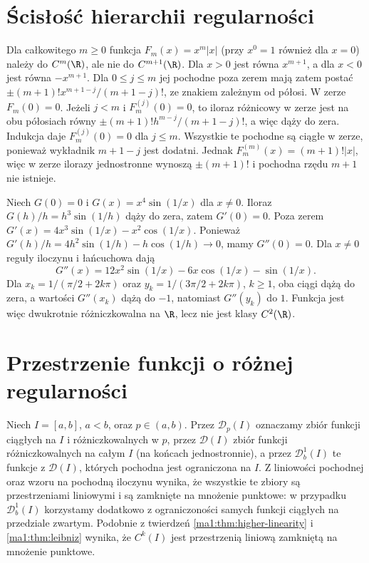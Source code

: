 \section{Ścisłość hierarchii regularności}
\begin{przyklad}
\label{ma1:ex:strict-c-hierarchy}
Dla całkowitego $m\ge0$ funkcja $F_m(x)=x^m|x|$ (przy $x^0=1$ również dla $x=0$) należy do $C^m(\R)$, ale nie do $C^{m+1}(\R)$. Dla $x>0$ jest równa $x^{m+1}$, a dla $x<0$ jest równa $-x^{m+1}$. Dla $0\le j\le m$ jej pochodne poza zerem mają zatem postać $\pm (m+1)!x^{m+1-j}/(m+1-j)!$, ze znakiem zależnym od półosi. W zerze $F_m(0)=0$. Jeżeli $j<m$ i $F_m^{(j)}(0)=0$, to iloraz różnicowy w zerze jest na obu półosiach równy $\pm (m+1)!h^{m-j}/(m+1-j)!$, a więc dąży do zera. Indukcja daje $F_m^{(j)}(0)=0$ dla $j\le m$. Wszystkie te pochodne są ciągłe w zerze, ponieważ wykładnik $m+1-j$ jest dodatni. Jednak $F_m^{(m)}(x)=(m+1)!|x|$, więc w zerze ilorazy jednostronne wynoszą $\pm(m+1)!$ i pochodna rzędu $m+1$ nie istnieje.
\end{przyklad}

\begin{przyklad}
\label{ma1:ex:second-derivative-discontinuous}
Niech $G(0)=0$ i $G(x)=x^4\sin(1/x)$ dla $x\ne0$. Iloraz $G(h)/h=h^3\sin(1/h)$ dąży do zera, zatem $G'(0)=0$. Poza zerem
$G'(x)=4x^3\sin(1/x)-x^2\cos(1/x)$.
Ponieważ $G'(h)/h=4h^2\sin(1/h)-h\cos(1/h)\to0$, mamy $G''(0)=0$. Dla $x\ne0$ reguły iloczynu i łańcuchowa dają
\[
 G''(x)=12x^2\sin(1/x)-6x\cos(1/x)-\sin(1/x).
\]
Dla $x_k=1/(\pi/2+2k\pi)$ oraz $y_k=1/(3\pi/2+2k\pi)$, $k\ge1$, oba ciągi dążą do zera, a wartości $G''(x_k)$ dążą do $-1$, natomiast $G''(y_k)$ do $1$. Funkcja jest więc dwukrotnie różniczkowalna na $\R$, lecz nie jest klasy $C^2(\R)$.
\end{przyklad}

\section{Przestrzenie funkcji o różnej regularności}
\label{ma1:sec:differentiable-function-classes}

Niech $I=[a,b]$, $a<b$, oraz $p\in(a,b)$.
Przez $\mathcal D_p(I)$ oznaczamy zbiór funkcji
ciągłych na $I$ i różniczkowalnych w $p$,
przez $\mathcal D(I)$ zbiór funkcji różniczkowalnych
na całym $I$ (na końcach jednostronnie), a przez
$\mathcal D_b^1(I)$ te funkcje z $\mathcal D(I)$,
których pochodna jest ograniczona na $I$.
Z liniowości pochodnej oraz wzoru na pochodną
iloczynu wynika, że wszystkie te zbiory są
przestrzeniami liniowymi i są zamknięte na
mnożenie punktowe: w przypadku $\mathcal D_b^1(I)$
korzystamy dodatkowo z ograniczoności samych
funkcji ciągłych na przedziale zwartym.
Podobnie z twierdzeń \ref{ma1:thm:higher-linearity}
i \ref{ma1:thm:leibniz} wynika, że $C^k(I)$
jest przestrzenią liniową zamkniętą na mnożenie
punktowe.

